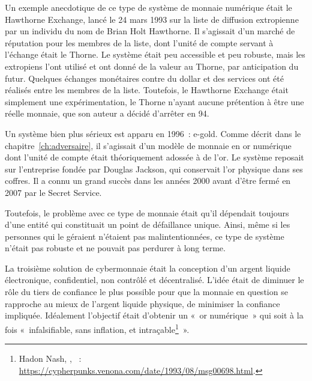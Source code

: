 Un exemple anecdotique de ce type de système de monnaie numérique était le Hawthorne Exchange, lancé le 24 mars 1993 sur la liste de diffusion extropienne par un individu du nom de Brian Holt Hawthorne. Il s'agissait d'un marché de réputation pour les membres de la liste, dont l'unité de compte servant à l'échange était le Thorne. Le système était peu accessible et peu robuste, mais les extropiens l'ont utilisé et ont donné de la valeur au Thorne, par anticipation du futur. Quelques échanges monétaires contre du dollar et des services ont été réalisés entre les membres de la liste. Toutefois, le Hawthorne Exchange était simplement une expérimentation, le Thorne n'ayant aucune prétention à être une réelle monnaie, que son auteur a décidé d'arrêter en 94. %

Un système bien plus sérieux est apparu en 1996~: e-gold. Comme décrit dans le chapitre~\ref{ch:adversaire}, il s'agissait d'un modèle de monnaie en or numérique dont l'unité de compte était théoriquement adossée à de l'or. Le système reposait sur l'entreprise  fondée par Douglas Jackson, qui conservait l'or physique dans ses coffres. Il a connu un grand succès dans les années 2000 avant d'être fermé en 2007 par le Secret Service.

Toutefois, le problème avec ce type de monnaie était qu'il dépendait toujours d'une entité qui constituait un point de défaillance unique. Ainsi, même si les personnes qui le géraient n'étaient pas malintentionnées, ce type de système n'était pas robuste et ne pouvait pas perdurer à long terme.


La troisième solution de cybermonnaie était la conception d'un argent liquide électronique, confidentiel, non contrôlé et décentralisé. L'idée était de diminuer le rôle du tiers de confiance le plus possible pour que la monnaie en question se rapproche au mieux de l'argent liquide physique, de minimiser la confiance impliquée. Idéalement l'objectif était d'obtenir un «~or numérique~» qui soit à la fois «~infalsifiable, sans inflation, et intraçable\footnote{Hadon Nash, , ~: \url{https://cypherpunks.venona.com/date/1993/08/msg00698.html}.}~». %

